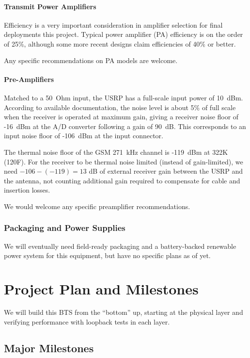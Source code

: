 \documentclass[11pt]{book}
\begin{document}
\subsubsection{Transmit Power Amplifiers}
Efficiency is a very important consideration in amplifier selection for final deployments this project.
Typical power amplifier (PA) efficiency is on the order of 25\%, although some more recent designs claim efficiencies of 40\% or better.

Any specific recommendations on PA models are welcome.


\subsubsection{Pre-Amplifiers}
Matched to a 50~Ohm input, the USRP has a full-scale input power of 10~dBm.
According to available documentation, the noise level is about 5\% of full scale when the receiver is operated at maximum gain, giving a receiver noise floor of -16~dBm at the A/D converter following a gain of 90~dB.
This corresponds to an input noise floor of -106~dBm at the input connector.

The thermal noise floor of the GSM 271~kHz channel is -119~dBm at 322K (120F).
For the receiver to be thermal noise limited (instead of gain-limited), we need $-106 - (-119) = 13$ dB of external receiver gain between the USRP and the antenna, not counting additional gain required to compensate for cable and insertion losses.


We would welcome any specific preamplifier recommendations.


\subsection{Packaging and Power Supplies}
We will eventually need field-ready packaging and a battery-backed renewable power system for this equipment, but have no specific plans as of yet.








\chapter{Project Plan and Milestones}
We will build this BTS from the ``bottom'' up, starting at the physical layer and verifying performance with loopback tests in each layer.

\section{Major Milestones}
\end{document}
